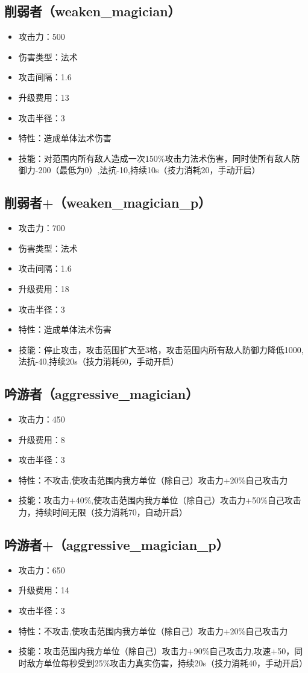 \documentclass[a4paper,12pt]{article}
\begin{document}
		\subsection{削弱者（weaken\_magician）}
			\begin{itemize}
				\item 攻击力：500
				\item 伤害类型：法术
				\item 攻击间隔：1.6
				\item 升级费用：13
				\item 攻击半径：3
				\item 特性：造成单体法术伤害
				\item 技能：对范围内所有敌人造成一次150\%攻击力法术伤害，同时使所有敌人防御力-200（最低为0）,法抗-10,持续10s（技力消耗20，手动开启）
			\end{itemize}
		\subsection{削弱者+（weaken\_magician\_p）}
			\begin{itemize}
				\item 攻击力：700
				\item 伤害类型：法术
				\item 攻击间隔：1.6
				\item 升级费用：18
				\item 攻击半径：3
				\item 特性：造成单体法术伤害
				\item 技能：停止攻击，攻击范围扩大至3格，攻击范围内所有敌人防御力降低1000,法抗-40,持续20s（技力消耗60，手动开启）
			\end{itemize}	
		\subsection{吟游者（aggressive\_magician）}
			\begin{itemize}
				\item 攻击力：450
				\item 升级费用：8
				\item 攻击半径：3
				\item 特性：不攻击,使攻击范围内我方单位（除自己）攻击力+20\%自己攻击力
				\item 技能：攻击力+40\%,使攻击范围内我方单位（除自己）攻击力+50\%自己攻击力，持续时间无限（技力消耗70，自动开启）
			\end{itemize}
		\subsection{吟游者+（aggressive\_magician\_p）}
			\begin{itemize}
				\item 攻击力：650
				\item 升级费用：14
				\item 攻击半径：3
				\item 特性：不攻击,使攻击范围内我方单位（除自己）攻击力+20\%自己攻击力
				\item 技能：攻击范围内我方单位（除自己）攻击力+90\%自己攻击力,攻速+50，同时敌方单位每秒受到25\%攻击力真实伤害，持续20s（技力消耗40，手动开启）
			\end{itemize}	
\end{document}
